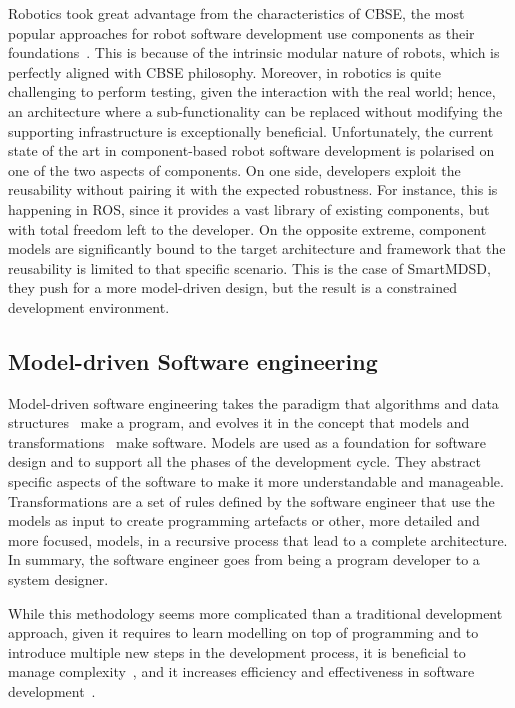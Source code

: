 Robotics took great advantage from the characteristics of CBSE, the most popular approaches for robot software development use components as their foundations~\cite{brugali2009component, brugali2010component}. This is because of the intrinsic modular nature of robots, which is perfectly aligned with CBSE philosophy. Moreover, in robotics is quite challenging to perform testing, given the interaction with the real world; hence, an architecture where a sub-functionality can be replaced without modifying the supporting infrastructure is exceptionally beneficial. Unfortunately, the current state of the art in component-based robot software development is polarised on one of the two aspects of components. On one side, developers exploit the reusability without pairing it with the expected robustness. For instance, this is happening in ROS, since it provides a vast library of existing components, but with total freedom left to the developer. On the opposite extreme, component models are significantly bound to the target architecture and framework that the reusability is limited to that specific scenario. This is the case of SmartMDSD, they push for a more model-driven design, but the result is a constrained development environment. 

\subsection{Model-driven Software engineering}
Model-driven software engineering takes the paradigm that algorithms and data structures~\cite{wirth1986algorithms} make a program, and evolves it in the concept that models and transformations~\cite{brambilla2012model} make software. Models are used as a foundation for software design and to support all the phases of the development cycle. They abstract specific aspects of the software to make it more understandable and manageable. Transformations are a set of rules defined by the software engineer that use the models as input to create programming artefacts or other, more detailed and more focused, models, in a recursive process that lead to a complete architecture. In summary, the software engineer goes from being a program developer to a system designer.

While this methodology seems more complicated than a traditional development approach, given it requires to learn modelling on top of programming and to introduce multiple new steps in the development process, it is beneficial to manage complexity~\cite{selic2003pragmatics}, and it increases efficiency and effectiveness in software development~\cite{acerbis2007developing}.

